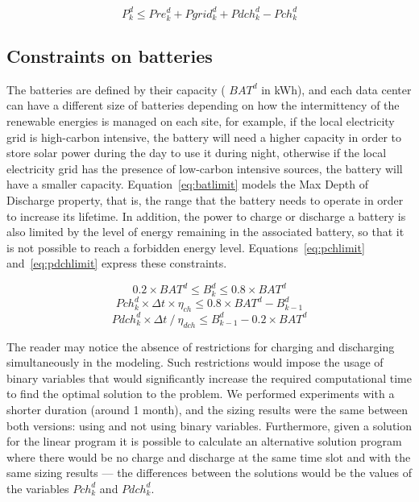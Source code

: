 \begin{equation} \label{eq:pkdconstraint}
    P^d_k \leq Pre^d_k + Pgrid^d_k + Pdch_k^d - Pch_k^d
\end{equation}

\subsection{Constraints on batteries}

The batteries are defined by their capacity ( $BAT^d$ in kWh), and each data center can have a different size of batteries depending on how the intermittency of the renewable energies is managed on each site, for example, if the local electricity grid is high-carbon intensive, the battery will need a higher capacity in order to store solar power during the day to use it during night, otherwise if the local electricity grid has the presence of low-carbon intensive sources, the battery will have a smaller capacity. Equation~\eqref{eq:batlimit} models the Max Depth of Discharge property, that is, the range that the battery needs to operate in order to increase its lifetime. In addition, the power to charge or discharge a battery is also limited by the level of energy remaining in the associated battery, so that it is not possible to reach a forbidden energy level. Equations~\eqref{eq:pchlimit} and~\eqref{eq:pdchlimit} express these constraints.

\begin{equation} \label{eq:batlimit}
0.2\times BAT^d\leq B_k^d\leq 0.8\times BAT^d
\end{equation}
\begin{equation} \label{eq:pchlimit}
Pch^d_k \times \Delta t \times \eta_{ch} \leq 0.8\times BAT^d - B^d_{k-1}
\end{equation}
\begin{equation} \label{eq:pdchlimit}
Pdch^d_k \times \Delta t\ / \ \eta_{dch} \leq B^d_{k-1} - 0.2\times BAT^d
\end{equation}


The reader may notice the absence of restrictions for charging and discharging simultaneously in the modeling. Such restrictions would impose the usage of binary variables that would significantly increase the required computational time to find the optimal solution to the problem. We performed experiments with a shorter duration (around 1 month), and the sizing results were the same between both versions: using and not using binary variables. Furthermore, given a solution for the linear program it is possible to calculate an alternative solution program where there would be no charge and discharge at the same time slot and with the same sizing results --- the differences between the solutions would be the values of the variables $Pch_k^d$ and $Pdch_k^d$.


